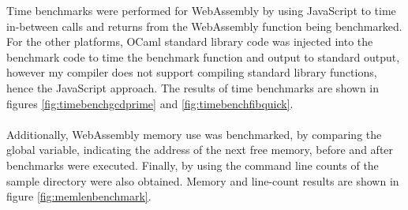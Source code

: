 Time benchmarks were performed for WebAssembly by using JavaScript to time in-between calls and returns from the WebAssembly function being benchmarked. For the other platforms, OCaml standard library code was injected into the benchmark code to time the benchmark function and output to standard output, however my compiler does not support compiling standard library functions, hence the JavaScript approach. The results of time benchmarks are shown in figures \ref{fig:timebenchgcdprime} and \ref{fig:timebenchfibquick}.
\\\\
Additionally, WebAssembly memory use was benchmarked, by comparing the  global variable, indicating the address of the next free memory, before and after benchmarks were executed. Finally, by using the  command line counts of the sample directory were also obtained. Memory and line-count results are shown in figure \ref{fig:memlenbenchmark}.

